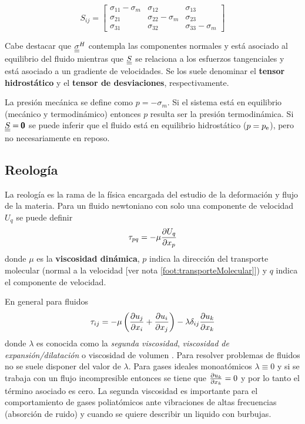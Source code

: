 \[
S_{ij}= \begin{bmatrix}
\sigma_{11}-\sigma_m & \sigma_{12} & \sigma_{13} \\
\sigma_{21} & \sigma_{22}-\sigma_m & \sigma_{23} \\
\sigma_{31} & \sigma_{32} & \sigma_{33}-\sigma_m 
\end{bmatrix}
\]

Cabe destacar que $\underline{\underline{\sigma}}^H$ contempla las componentes normales y está asociado al equilibrio del fluido mientras que $\underline{\underline{S}}$ se relaciona a los esfuerzos tangenciales y está asociado a un gradiente de velocidades. Se los suele denominar el \textbf{tensor hidrostático} y el \textbf{tensor de desviaciones}, respectivamente. 

La presión mecánica se define como $p=-\sigma_m$. Si el sistema está en equilibrio (mecánico y termodinámico) entonces $p$ resulta ser la presión termodinámica. Si $\underline{\underline{S}}=\pmb{0}$ se puede inferir que el fluido está en equilibrio hidrostático ($p=\pe$), pero no necesariamente en reposo.
 \label{sec:presionmecanica}
 

\subsection{Reología} \label{sec:reologia}
La reología es la rama de la física encargada del estudio de la deformación y flujo de la materia. Para un fluido newtoniano con solo una componente de velocidad $U_q$ se puede definir
\begin{equation}
    \tau_{pq}=-\mu \frac{\partial U_q}{\partial x_p}
\end{equation}
donde $\mu$ es la \textbf{viscosidad dinámica}, $p$ indica la dirección del transporte molecular (normal a la velocidad [ver nota \ref{foot:transporteMolecular}]) y $q$ indica el componente de velocidad.

En general para fluidos
\begin{equation}
    \tau_{ij}=-\mu \left( \frac{\partial u_j}{\partial x_i}+\frac{\partial u_i}{\partial x_j}\right) -\lambda \delta_{ij} \frac{\partial u_k}{\partial x_k}
\end{equation}
donde $\lambda$ es conocida como la \textit{segunda viscosidad}, \textit{viscosidad de expansión/dilatación} o viscosidad de volumen \citep{durst2008fluid}. Para resolver problemas de fluidos no se suele disponer del valor de $\lambda$. Para gases ideales monoatómicos $\lambda \equiv 0$ y si se trabaja con un flujo incompresible entonces se tiene que $\frac{\partial u_k}{\partial x_k}=0$ y por lo tanto el término asociado es cero. La segunda viscosidad es importante para el comportamiento de gases poliatómicos ante vibraciones de altas frecuencias (absorción de ruido) y cuando se quiere describir un liquido con burbujas.

